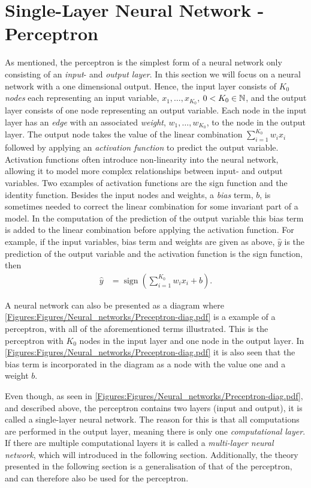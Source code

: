 \section{Single-Layer Neural Network - Perceptron}
As mentioned, the perceptron is the simplest form of a neural network only consisting of an \emph{input}- and \emph{output layer}. In this section we will focus on a neural network with a one dimensional output. Hence, the input layer consists of $K_0$ \emph{nodes} each representing an input variable, $x_1, \ldots, x_{K_0}$, $0 < K_0 \in \mathbb{N}$, and the output layer consists of one node representing an output variable. Each node in the input layer has an \emph{edge} with an associated \emph{weight}, $w_1, \ldots, w_{K_0}$, to the node in the output layer. The output node takes the value of the linear combination $\sum_{i = 1}^{K_0} w_ix_i$ followed by applying an \emph{activation function} to predict the output variable. Activation functions often introduce non-linearity into the neural network, allowing it to model more complex relationships between input- and output variables. Two examples of activation functions are the sign function and the identity function. Besides the input nodes and weights, a \emph{bias} term, $b$, is sometimes needed to correct the linear combination for some invariant part of a model. In the computation of the prediction of the output variable this bias term is added to the linear combination before applying the activation function. For example, if the input variables, bias term and weights are given as above, $\hat{y}$ is the prediction of the output variable and the activation function is the sign function, then
\begin{align}\label{eq:sign_perceptron_output}
    \hat{y} &=  \operatorname{sign}\left(\sum_{i=1}^{K_0} w_ix_i + b\right).
\end{align}
 
A neural network can also be presented as a diagram where \autoref{Figures:Figures/Neural_networks/Preceptron-diag.pdf} is a example of a perceptron, with all of the aforementioned terms illustrated. This is the perceptron with $K_0$ nodes in the input layer and one node in the output layer. In \autoref{Figures:Figures/Neural_networks/Preceptron-diag.pdf} it is also seen that the bias term is incorporated in the diagram as a node with the value one and a weight $b$.

Even though, as seen in \autoref{Figures:Figures/Neural_networks/Preceptron-diag.pdf}, and described above, the perceptron contains two layers (input and output), it is called a single-layer neural network. The reason for this is that all computations are performed in the output layer, meaning there is only one \emph{computational layer}. If there are multiple computational layers it is called a \emph{multi-layer neural network}, which will introduced in the following section. Additionally, the theory presented in the following section is a generalisation of that of the perceptron, and can therefore also be used for the perceptron. 


